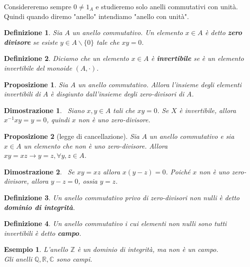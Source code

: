 \documentclass[a4paper,12pt]{article}
\theoremstyle{def}
\newtheorem*{definition}{Definizione}
\theoremstyle{prop}
\newtheorem*{proposition}{Proposizione}
\theoremstyle{esempio}
\newtheorem*{example}{Esempio}
\theoremstyle{dimostrazione}
\newtheorem*{dimostrazione}{Dimostrazione}
\theoremstyle{teo}
\theoremstyle{osservazione}
\begin{document}
Considereremo sempre \(0 \neq 1_A\) e studieremo solo anelli commutativi con unità. Quindi quando diremo "anello" intendiamo "anello con unità".

\begin{definition}
	Sia \(A\) un anello commutativo. Un elemento \(x \in A\) è detto \textbf{zero divisore} se esiste \(y \in A \backslash \{0\}\)
	tale che \(x y = 0\).
\end{definition}

\begin{definition}
	Diciamo che un elemento \(x \in A\) è \textbf{invertibile} se è un elemento invertibile del
	monoide \((A, \cdot )\).
\end{definition}

\begin{proposition}
	Sia \(A\) un anello commutativo. Allora l'insieme degli elementi invertibili di \(A\) è disgiunto
	dall'insieme degli zero-divisori di \(A\).
\end{proposition}

\begin{dimostrazione}
	\
	Siano \(x,y \in A\) tali che \(x y = 0\). Se \(X\) è invertibile, allora \(x^{-1}xy = y = 0\),
	quindi \(x\) non è uno zero-divisore.
\end{dimostrazione}

\begin{proposition}[legge di cancellazione]
	Sia \(A\) un anello commutativo e sia \(x \in A\) un elemento che non è uno zero-divisore. Allora
	\(xy=xz \rightarrow y =z , \forall y,z \in A\).
\end{proposition}

\begin{dimostrazione}
	\
	Se \(xy = xz\) allora \(x(y - z) = 0 \). Poiché \(x\) non è uno zero-divisore, allora \(y-z = 0\), ossia \(y=z\).
\end{dimostrazione}

\begin{definition}
	Un anello commutativo privo di zero-divisori non nulli è detto \textbf{dominio di integrità}.
\end{definition}

\begin{definition}
	Un anello commutativo i cui elementi non nulli sono tutti invertibili è detto \textbf{campo}.
\end{definition}

\begin{example}
	L'anello \(\mathbb{Z}\) è un dominio di integrità, ma non è un campo.\\
	Gli anelli \(\mathbb{Q} ,\mathbb{R} ,\mathbb{C} \) sono campi.
\end{example}
\end{document}
